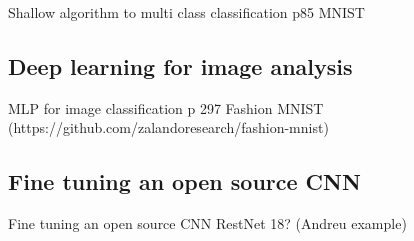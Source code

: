 Shallow algorithm to multi class classification  p85   MNIST

\subsection{Deep learning for image analysis}
\label{subsec:deep}

MLP for image classification p 297   Fashion MNIST (https://github.com/zalandoresearch/fashion-mnist)

\subsection{Fine tuning an open source CNN}
\label{subsec:deep}

Fine tuning an open source CNN   RestNet 18? (Andreu example)